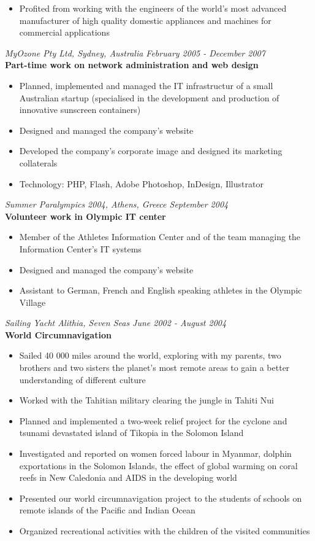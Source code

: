 \documentclass[margin]{res}
\begin{document}
\begin{resume}
\begin{itemize}
  \item Profited from working with the engineers of the world’s most advanced manufacturer of high quality domestic appliances and machines for commercial applications
  \end{itemize}
  {\it MyOzone Pty Ltd, Sydney, Australia \hfill February 2005 - December 2007} \\
  {\bf Part-time work on network administration and web design}
  \begin{itemize} \itemsep -0.5pt
  \item Planned, implemented and managed the IT infrastructur of a small Australian startup (specialised in the development and production of innovative sunscreen containers)
  \item Designed and managed the company’s website
  \item Developed the company’s corporate image and designed its marketing collaterals
  \item Technology: PHP, Flash, Adobe Photoshop, InDesign, Illustrator
  \end{itemize}
  {\it Summer Paralympics 2004, Athens, Greece \hfill September 2004} \\
  {\bf Volunteer work in Olympic IT center}
  \begin{itemize} \itemsep -0.5pt
  \item Member of the Athletes Information Center and of the team managing the Information Center’s IT systems
  \item Designed and managed the company’s website
  \item Assistant to German, French and English speaking athletes in the Olympic Village
  \end{itemize}
  {\it Sailing Yacht Alithia, Seven Seas \hfill June 2002 - August 2004} \\
  {\bf World Circumnavigation}
  \begin{itemize} \itemsep -0.5pt
  \item Sailed 40 000 miles around the world, exploring with my parents, two brothers and two sisters the planet’s most remote areas to gain a better understanding of different culture
  \item Worked with the Tahitian military clearing the jungle in Tahiti Nui
  \item Planned and implemented a two-week relief project for the cyclone and tsunami devastated island of Tikopia in the Solomon Island
  \item Investigated and reported on women forced labour in Myanmar, dolphin exportations in the Solomon Islands, the effect of global warming on coral reefs in New Caledonia and AIDS in the developing world
  \item Presented our world circumnavigation project to the students of schools on remote islands of the Pacific and Indian Ocean
  \item Organized recreational activities with the children of the visited communities
  \end{itemize}


\end{resume}
\end{document}
